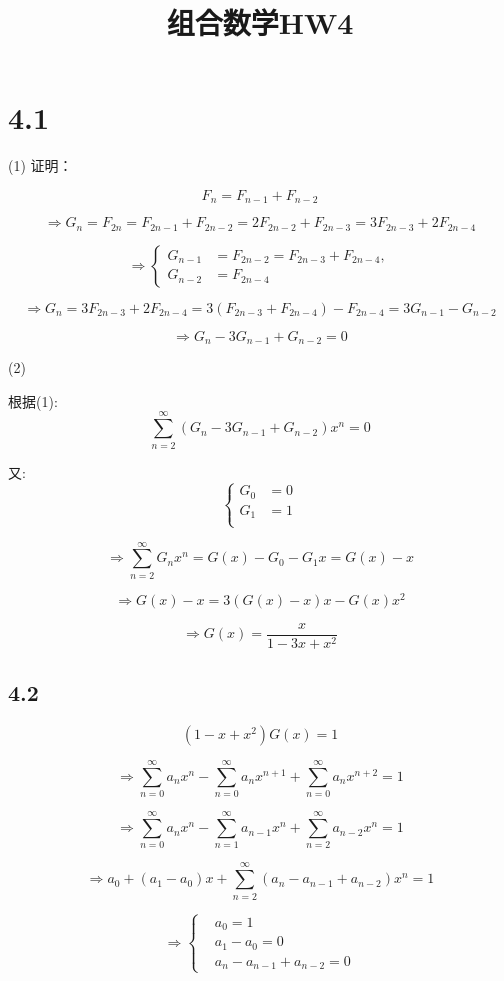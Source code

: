 \documentclass{article}
\title{组合数学HW4}
\begin{document}
\maketitle
\section*{4.1}

(1) 证明：

\[
F_n=F_{n-1}+F_{n-2}
\]

\[
\Rightarrow
G_n=F_{2n}=F_{2n-1}+F_{2n-2}=2F_{2n-2}+F_{2n-3}=3F_{2n-3}+2F_{2n-4}
\]

\[
\Rightarrow
\left\{
\begin{aligned}
G_{n-1}&=F_{2n-2}=F_{2n-3}+F_{2n-4}, \\
G_{n-2}&=F_{2n-4}
\end{aligned}
\right.
\]

\[
\Rightarrow
G_n=3F_{2n-3}+2F_{2n-4}=3(F_{2n-3}+F_{2n-4})-F_{2n-4}=3G_{n-1}-G_{n-2}
\]

\[
\Rightarrow
G_n-3G_{n-1}+G_{n-2}=0
\]


(2) 

根据(1):
\[
\sum_{n=2}^{\infty}(G_n-3G_{n-1}+G_{n-2})x^n=0
\]

又:
\[
\left\{
\begin{aligned}
G_0&=0 \\
G_1&=1 \\
\end{aligned}
\right.
\]

\[
\Rightarrow
\sum_{n=2}^\infty G_nx^n = G(x)-G_0-G_1x = G(x)-x
\]

\[
\Rightarrow
G(x)-x=3(G(x)-x)x-G(x)x^2
\]

\[
\Rightarrow
G(x)=\dfrac{x}{1-3x+x^2}
\]

\subsection*{4.2}

\[
(1-x+x^2)G(x) = 1
\]

\[
\Rightarrow
\sum_{n=0}^\infty{a_nx^n} - \sum_{n=0}^\infty{a_{n}x^{n+1}} + \sum_{n=0}^\infty{a_{n}x^{n+2}} = 1
\]

\[
\Rightarrow
\sum_{n=0}^\infty{a_nx^n} - \sum_{n=1}^\infty{a_{n-1}x^{n}} + \sum_{n=2}^\infty{a_{n-2}x^{n}} = 1
\]

\[
\Rightarrow
a_0+(a_1-a_0)x+\sum_{n=2}^\infty{(a_n-a_{n-1}+a_{n-2})x^n}=1
\]

\[
\Rightarrow
\left\{
\begin{aligned}
&a_0=1 \\
&a_1-a_0=0 \\
&a_n-a_{n-1}+a_{n-2}=0
\end{aligned}
\right.
\]
\end{document}
